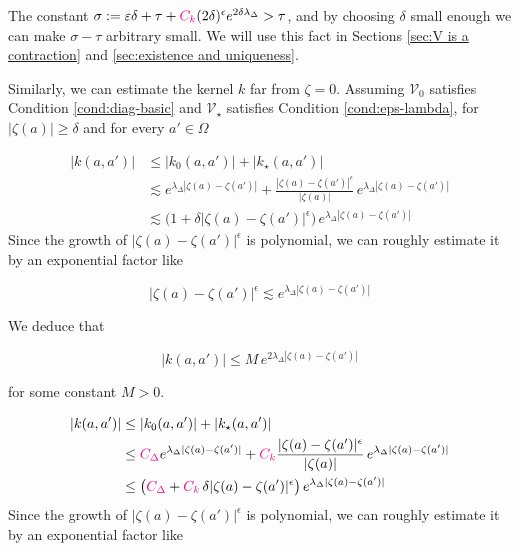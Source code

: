 \documentclass{article}
\theoremstyle{plain}
\newcommand{\hardpart}{\mathcal{V}_0}
\newcommand{\softpart}{\mathcal{V}_\star}
\newcommand{\hardker}{k_0}
\newcommand{\softker}{k_\star}
\begin{document}
The constant $\sigma:=\varepsilon\delta+\tau+ \textcolor{magenta}{C_k} (2\delta)^\epsilon e^{2\delta \lambda_\Delta} > \tau $, and by choosing $\delta$ small enough we can make $\sigma-\tau$ arbitrary small. We will use this fact in Sections \ref{sec:V is a contraction} and \ref{sec:existence and uniqueness}.

\color{black}

Similarly, we can estimate the kernel $k$ far from $\zeta=0$. Assuming $\hardpart$ satisfies Condition \eqref{cond:diag-basic} and $\softpart$ satisfies Condition \eqref{cond:eps-lambda}, for $|\zeta(a)|\geq \delta$ and for every $a'\in\Omega$

\begin{align*}
    |k(a,a')|&\leq |\hardker(a,a')| + |\softker(a,a')|\\
    &\lesssim e^{\lambda_\Delta |\zeta(a)-\zeta(a')|} + \frac{|\zeta(a)-\zeta(a')|^\epsilon}{|\zeta(a)|}\,e^{\lambda_\Delta|\zeta(a)-\zeta(a')|}\\
    &\lesssim \big(1 + \delta |\zeta(a)-\zeta(a')|^\epsilon \big) \, e^{\lambda_\Delta|\zeta(a)-\zeta(a')|}
\end{align*}
Since the growth of $|\zeta(a)-\zeta(a')|^\epsilon$ is polynomial, we can roughly estimate it by an exponential factor like 

\[|\zeta(a)-\zeta(a')|^\epsilon\lesssim e^{\lambda_\Delta |\zeta(a)-\zeta(a')|} \]

We deduce that 

\[ |k(a,a')| \leq M\, e^{2 \lambda_\Delta |\zeta(a)-\zeta(a')|} \]

for some constant $M>0$. 


\color{Tomato}
\begin{align*}
    |k(a,a')|&\leq |\hardker(a,a')| + |\softker(a,a')|\\
    &\leq \textcolor{magenta}{C_\Delta} e^{\lambda_\Delta |\zeta(a)-\zeta(a')|} +\textcolor{magenta}{C_k}\frac{|\zeta(a)-\zeta(a')|^\epsilon}{|\zeta(a)|}\,e^{\lambda_\Delta|\zeta(a)-\zeta(a')|}\\
    &\leq \big(\textcolor{magenta}{C_\Delta} + \textcolor{magenta}{C_k}\, \delta |\zeta(a)-\zeta(a')|^\epsilon \big) \, e^{\lambda_\Delta|\zeta(a)-\zeta(a')|}
\end{align*}
Since the growth of $|\zeta(a)-\zeta(a')|^\epsilon$ is polynomial, we can roughly estimate it by an exponential factor like 
\end{document}
